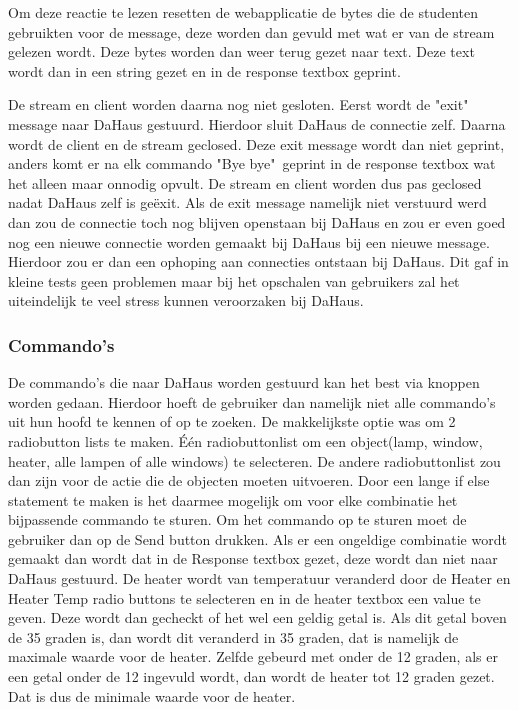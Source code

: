 \documentclass[11pt]{article}
\begin{document}
	Om deze reactie te lezen resetten de webapplicatie de bytes die de studenten gebruikten voor de message, deze worden dan gevuld met wat er van de stream gelezen wordt. Deze bytes worden dan weer terug gezet naar text. Deze text wordt dan in een string gezet en in de response textbox geprint. 
	
	De stream en client worden daarna nog niet gesloten. Eerst wordt de "exit" message naar DaHaus gestuurd. Hierdoor sluit DaHaus de connectie zelf. Daarna wordt de client en de stream geclosed. Deze exit message wordt dan niet geprint, anders komt er na elk commando "Bye bye"\  geprint in de response textbox wat het alleen maar onnodig opvult. De stream en client worden dus pas geclosed nadat DaHaus zelf is ge\"{e}xit. Als de exit message namelijk niet verstuurd werd dan zou de connectie toch nog blijven openstaan bij DaHaus en zou er even goed nog een nieuwe connectie worden gemaakt bij DaHaus bij een nieuwe message. Hierdoor zou er dan een ophoping aan connecties ontstaan bij DaHaus. Dit gaf in kleine tests geen problemen maar bij het opschalen van gebruikers zal het uiteindelijk te veel stress kunnen veroorzaken bij DaHaus. 
	\subsubsection{Commando's}
	
	De commando's die naar DaHaus worden gestuurd kan het best via knoppen worden gedaan. Hierdoor hoeft de gebruiker dan namelijk niet alle commando's uit hun hoofd te kennen of op te zoeken. De makkelijkste optie was om 2 radiobutton lists te maken. \'{E}\'{e}n radiobuttonlist om een object(lamp, window, heater, alle lampen of alle windows) te selecteren. De andere radiobuttonlist zou dan zijn voor de actie die de objecten moeten uitvoeren. Door een lange if else statement te maken is het daarmee mogelijk om voor elke combinatie het bijpassende commando te sturen. Om het commando op te sturen moet de gebruiker dan op de Send button drukken. Als er een ongeldige combinatie wordt gemaakt dan wordt dat in de Response textbox gezet, deze wordt dan niet naar DaHaus gestuurd. De heater wordt van temperatuur veranderd door de Heater en Heater Temp radio buttons te selecteren en in de heater textbox een value te geven. Deze wordt dan gecheckt of het wel een geldig getal is. Als dit getal boven de 35 graden is, dan wordt dit veranderd in 35 graden, dat is namelijk de maximale waarde voor de heater. Zelfde gebeurd met onder de 12 graden, als er een getal onder de 12 ingevuld wordt, dan wordt de heater tot 12 graden gezet. Dat is dus de minimale waarde voor de heater. 
\end{document}
